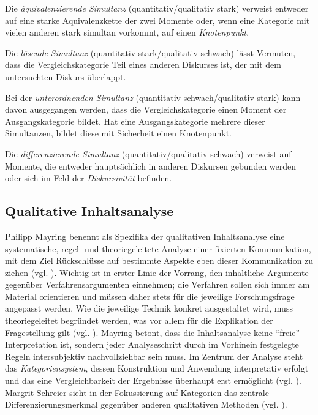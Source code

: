 \documentclass[12pt, titlepage=true, toc=bib]{scrartcl}
\begin{document}
{\noindent Die \textit{äquivalenzierende Simultanz} (quantitativ/qualitativ stark) verweist entweder auf eine starke Aquivalenzkette der zwei Momente oder, wenn eine Kategorie mit vielen anderen stark simultan vorkommt, auf einen \textit{Knotenpunkt}.

\noindent Die \textit{lösende Simultanz} (quantitativ stark/qualitativ schwach) lässt Vermuten, dass die Vergleichskategorie Teil eines anderen Diskurses ist, der mit dem untersuchten Diskurs überlappt.

\noindent Bei der \textit{unterordnenden Simultanz} (quantitativ schwach/qualitativ stark) kann davon ausgegangen werden, dass die Vergleichskategorie einen Moment der Ausgangskategorie bildet. Hat eine Ausgangskategorie mehrere dieser Simultanzen, bildet diese mit Sicherheit einen Knotenpunkt.

\noindent Die \textit{differenzierende Simultanz} (quantitativ/qualitativ schwach) verweist auf Momente, die entweder hauptsächlich in anderen Diskursen gebunden werden oder sich im Feld der \textit{Diskursivität} befinden.

\subsection{Qualitative Inhaltsanalyse}

Philipp Mayring benennt als Spezifika der qualitativen Inhaltsanalyse eine systematische, regel- und theoriegeleitete Analyse einer fixierten Kommunikation, mit dem Ziel Rückschlüsse auf bestimmte Aspekte eben dieser Kommunikation zu ziehen (vgl. \cite*[13]{mayring_qualitative_2010}). Wichtig ist in erster Linie der Vorrang, den inhaltliche Argumente gegenüber Verfahrensargumenten einnehmen; die Verfahren sollen sich immer am Material orientieren und müssen daher stets für die jeweilige Forschungsfrage angepasst werden. Wie die jeweilige Technik konkret ausgestaltet wird, muss theoriegeleitet begründet werden, was vor allem für die Explikation der Fragestellung gilt (vgl. \cite[50-51]{mayring_qualitative_2010}). Mayring betont, dass die Inhaltsanalyse keine "`freie"' Interpretation ist, sondern jeder Analyseschritt durch im Vorhinein festgelegte Regeln intersubjektiv nachvollziehbar sein muss. Im Zentrum der Analyse steht das \textit{Kategoriensystem}, dessen Konstruktion und Anwendung interpretativ erfolgt und das eine Vergleichbarkeit der Ergebnisse überhaupt erst ermöglicht (vgl. \cite[49]{mayring_qualitative_2010}). Margrit Schreier sieht in der Fokussierung auf Kategorien das zentrale Differenzierungsmerkmal gegenüber anderen qualitativen Methoden (vgl. \cite[3]{schreier_varianten_2014}).

}
\end{document}
